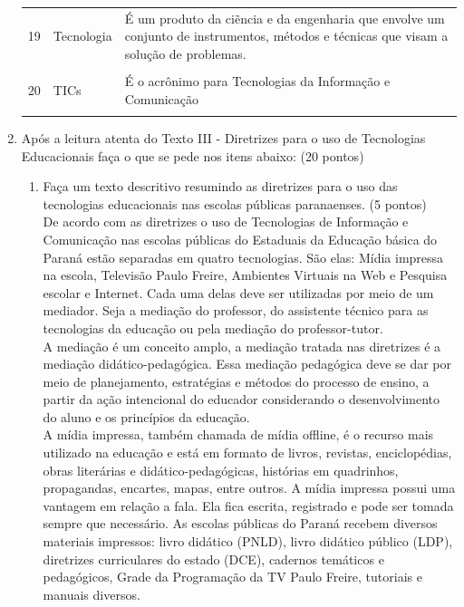 \documentclass[a4paper, 12pt]{article}
\begin{document}
\begin{enumerate}
\begin{tabular}{|m{0.5cm}|m{5cm}|m{8cm}|}
      \hline
      19 & Tecnologia & É um produto da ciẽncia e da engenharia que envolve um conjunto de instrumentos, métodos e técnicas que visam a solução de problemas. \\ \\
      \hline
      20 & TICs & É o acrônimo para Tecnologias da Informação e Comunicação \\ \\
      \hline
    \end{tabular}
  \item Após a leitura  atenta do Texto III - Diretrizes para o uso de Tecnologias Educacionais faça o que se pede nos itens abaixo: (20 pontos)
    \begin{enumerate}
    \item Faça um texto descritivo  resumindo as diretrizes para o uso das tecnologias educacionais nas escolas públicas paranaenses. (5 pontos) \\
      De acordo com as diretrizes o uso de Tecnologias de Informação e Comunicação nas escolas públicas do Estaduais da Educação básica do Paraná estão separadas em quatro tecnologias. São elas: Mídia impressa na escola, Televisão Paulo Freire, Ambientes Virtuais na Web e Pesquisa escolar e Internet. Cada uma delas deve ser utilizadas por meio de um mediador. Seja a mediação do professor, do assistente técnico para as tecnologias da educação ou pela mediação do professor-tutor. \\
      A mediação é um conceito amplo, a mediação tratada nas diretrizes é a mediação didático-pedagógica. Essa mediação pedagógica deve se dar por meio de planejamento, estratégias e métodos do processo de ensino, a  partir da ação intencional do educador considerando o desenvolvimento do aluno e os princípios da educação. \\
      A mídia impressa, também chamada de mídia offline, é o recurso mais utilizado na educação e está em formato de livros, revistas, enciclopédias, obras literárias e didático-pedagógicas, histórias em quadrinhos, propagandas, encartes, mapas, entre outros. A mídia impressa possui uma vantagem em relação a fala. Ela fica escrita, registrado e pode ser tomada sempre que necessário. As escolas públicas do Paraná recebem diversos materiais impressos: livro didático (PNLD), livro didático público (LDP), diretrizes curriculares do estado (DCE), cadernos temáticos e pedagógicos, Grade da Programação da TV Paulo Freire, tutoriais e manuais diversos. \\

\end{enumerate}
\end{enumerate}
\end{document}
